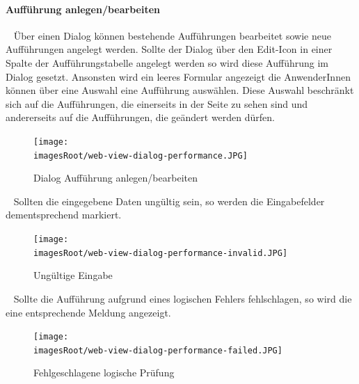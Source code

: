 \documentclass[11pt, a4paper, twoside]{article}   	%
\newcommand{\imagesRoot}{images}
\begin{document}
\paragraph{Aufführung anlegen/bearbeiten}
\ \newline 
Über einen Dialog können bestehende Aufführungen bearbeitet sowie neue Aufführungen angelegt werden. Sollte der Dialog über den Edit-Icon in einer Spalte der Aufführungstabelle angelegt werden so wird diese Aufführung im Dialog gesetzt. Ansonsten wird ein leeres Formular angezeigt die AnwenderInnen können über eine Auswahl eine Aufführung auswählen. Diese Auswahl beschränkt sich auf die Aufführungen, die einerseits in der Seite zu sehen sind und andererseits auf die Aufführungen, die geändert werden dürfen.
\begin{figure}[h]
	\centering
	\texttt{[image: \\imagesRoot/web-view-dialog-performance.JPG]}
	\caption
	{Dialog Aufführung anlegen/bearbeiten}
\end{figure}
\ \newline
Sollten die eingegebene Daten ungültig sein, so werden die Eingabefelder dementsprechend markiert.
\begin{figure}[h]
	\centering
	\texttt{[image: \\imagesRoot/web-view-dialog-performance-invalid.JPG]}
	\caption
	{Ungültige Eingabe}
\end{figure}
\ \newpage
Sollte die Aufführung aufgrund eines logischen Fehlers fehlschlagen, so wird die eine entsprechende Meldung angezeigt.
\begin{figure}[h]
	\centering
	\texttt{[image: \\imagesRoot/web-view-dialog-performance-failed.JPG]}
	\caption
	{Fehlgeschlagene logische Prüfung}
\end{figure}
\ \newpage
\end{document}
